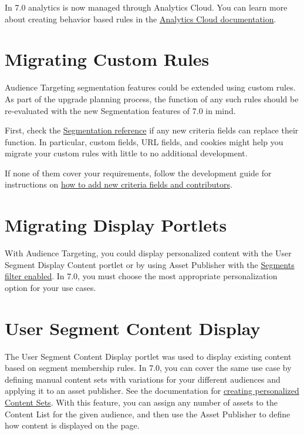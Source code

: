 In 7.0 analytics is now managed through Analytics Cloud. You can learn
more about creating behavior based rules in the
\href{https://help.liferay.com/hc/en-us/articles/360006947671-Creating-Segments}{Analytics
Cloud documentation}.

\section{Migrating Custom Rules}\label{migrating-custom-rules}

Audience Targeting segmentation features could be extended using custom
rules. As part of the upgrade planning process, the function of any such
rules should be re-evaluated with the new Segmentation features of 7.0
in mind.

First, check the
\href{/docs/7-2/reference/-/knowledge_base/r/defining-segmentation-criteria}{Segmentation
reference} if any new criteria fields can replace their function. In
particular, custom fields, URL fields, and cookies might help you
migrate your custom rules with little to no additional development.

If none of them cover your requirements, follow the development guide
for instructions on
\href{/docs/7-2/frameworks/-/knowledge_base/f/segmentation-personalization}{how
to add new criteria fields and contributors}.

\section{Migrating Display Portlets}\label{migrating-display-portlets}

With Audience Targeting, you could display personalized content with the
User Segment Display Content portlet or by using Asset Publisher with
the
\href{https://help.liferay.com/hc/en-us/articles/360018174271-Using-the-Audience-Targeting-Widgets-}{Segments
filter enabled}. In 7.0, you must choose the most appropriate
personalization option for your use cases.

\section{User Segment Content
Display}\label{user-segment-content-display}

The User Segment Content Display portlet was used to display existing
content based on segment membership rules. In 7.0, you can cover the
same use case by defining manual content sets with variations for your
different audiences and applying it to an asset publisher. See the
documentation for
\href{/docs/7-2/user/-/knowledge_base/u/content-set-personalization}{creating
personalized Content Sets}. With this feature, you can assign any number
of assets to the Content List for the given audience, and then use the
Asset Publisher to define how content is displayed on the page.

